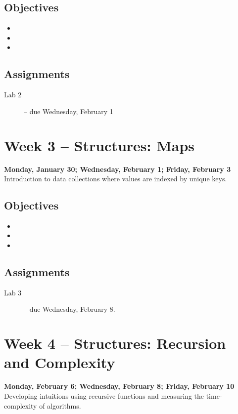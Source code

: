 \documentclass[10pt]{memoir}
\begin{document}
    \subsection{Objectives}
    \begin{itemize}
        \item 
        \item 
        \item 
    \end{itemize}

    \subsection{Assignments}
    \begin{description}%
        \item[Lab 2 ] -- due Wednesday, February 1
    \end{description}

\section{Week 3 -- Structures: Maps}
\textcolor{CUGold}{\textbf{Monday, January 30; Wednesday, February 1; Friday, February 3}}\\
Introduction to data collections where values are indexed by unique keys.

    \subsection{Objectives}
    \begin{itemize}
        \item 
        \item 
        \item 
    \end{itemize}

    \subsection{Assignments}
    \begin{description}%
        \item[Lab 3 ] -- due Wednesday, February 8.
    \end{description}

\section{Week 4 -- Structures: Recursion and Complexity}
\textcolor{CUGold}{\textbf{Monday, February 6; Wednesday, February 8; Friday, February 10}}\\
Developing intuitions using recursive functions and measuring the time-complexity of algorithms.
\end{document}
